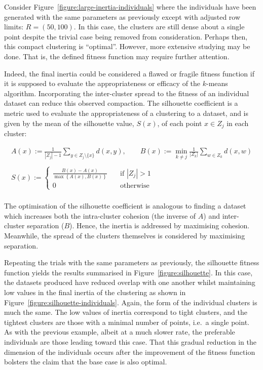 Consider Figure~\ref{figure:large-inertia-individuals} where the individuals
have been generated with the same parameters as previously except with adjusted
row limits: \(R = (50, 100)\). In this case, the clusters are still dense about
a single point despite the trivial case being removed from consideration.
Perhaps then, this compact clustering is ``optimal''. However, more extensive
studying may be done. That is, the defined fitness function may require further
attention.

Indeed, the final inertia could be considered a flawed or fragile fitness
function if it is supposed to evaluate the appropriateness or efficacy of the
\(k\)-means algorithm. Incorporating the inter-cluster spread to the fitness of
an individual dataset can reduce this observed compaction. The silhouette
coefficient is a metric used to evaluate the appropriateness of a clustering to
a dataset, and is given by the mean of the silhouette value, \(S(x)\), of each
point \(x \in Z_j\) in each cluster:

\begin{equation}
    \begin{gathered}
        A(x) := \frac{1}{|Z_j| - 1} \sum_{y \in Z_j \setminus \{x\}} d(x, y),
        \qquad B(x) := \min_{k \neq j} \frac{1}{|Z_k|} \sum_{w \in Z_k} d(x, w)
        \\\\
        S(x) := 
            \begin{cases}
                \frac{B(x) - A(x)}{\max\left\{A(x), B(x)\right\}}
                &\quad \text{if } |Z_j| > 1\\
                0 &\quad \text{otherwise}
            \end{cases}\label{eq:silhouette}
    \end{gathered}
\end{equation}\\

The optimisation of the silhouette coefficient is analogous to finding a dataset
which increases both the intra-cluster cohesion (the inverse of \(A\)) and
inter-cluster separation (\(B\)). Hence, the inertia is addressed by maximising
cohesion. Meanwhile, the spread of the clusters themselves is considered by
maximising separation.

Repeating the trials with the same parameters as previously, the silhouette
fitness function yields the results summarised in
Figure~\ref{figure:silhouette}. In this case, the datasets produced have reduced
overlap with one another whilst maintaining low values in the final inertia of
the clustering as shown in Figure~\ref{figure:silhouette-individuals}. Again,
the form of the individual clusters is much the same. The low values of inertia
correspond to tight clusters, and the tightest clusters are those with a minimal
number of points, i.e.\ a single point. As with the previous example, albeit at
a much slower rate, the preferable individuals are those leading toward this
case. That this gradual reduction in the dimension of the individuals occurs
after the improvement of the fitness function bolsters the claim that the base
case is also optimal.


